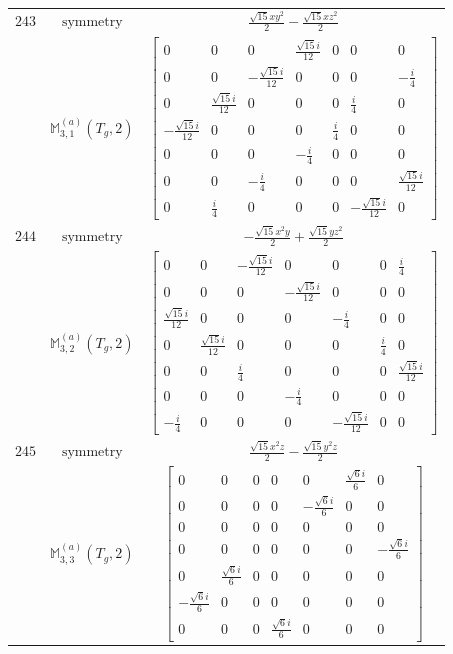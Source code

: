 \documentclass[fleqn,8pt,landscape]{jsarticle}
\begin{document}
\begin{longtable}{ccc}
$ 243 $ & $ \text{symmetry} $ & $ \frac{\sqrt{15} x y^{2}}{2} - \frac{\sqrt{15} x z^{2}}{2} $ \\
$  $ & $ \mathbb{M}_{3,1}^{(a)}(T_{g},2) $ & $ \begin{bmatrix} 0 & 0 & 0 & \frac{\sqrt{15} i}{12} & 0 & 0 & 0 \\ 0 & 0 & - \frac{\sqrt{15} i}{12} & 0 & 0 & 0 & - \frac{i}{4} \\ 0 & \frac{\sqrt{15} i}{12} & 0 & 0 & 0 & \frac{i}{4} & 0 \\ - \frac{\sqrt{15} i}{12} & 0 & 0 & 0 & \frac{i}{4} & 0 & 0 \\ 0 & 0 & 0 & - \frac{i}{4} & 0 & 0 & 0 \\ 0 & 0 & - \frac{i}{4} & 0 & 0 & 0 & \frac{\sqrt{15} i}{12} \\ 0 & \frac{i}{4} & 0 & 0 & 0 & - \frac{\sqrt{15} i}{12} & 0 \end{bmatrix} $ \\ \hline
$ 244 $ & $ \text{symmetry} $ & $ - \frac{\sqrt{15} x^{2} y}{2} + \frac{\sqrt{15} y z^{2}}{2} $ \\
$  $ & $ \mathbb{M}_{3,2}^{(a)}(T_{g},2) $ & $ \begin{bmatrix} 0 & 0 & - \frac{\sqrt{15} i}{12} & 0 & 0 & 0 & \frac{i}{4} \\ 0 & 0 & 0 & - \frac{\sqrt{15} i}{12} & 0 & 0 & 0 \\ \frac{\sqrt{15} i}{12} & 0 & 0 & 0 & - \frac{i}{4} & 0 & 0 \\ 0 & \frac{\sqrt{15} i}{12} & 0 & 0 & 0 & \frac{i}{4} & 0 \\ 0 & 0 & \frac{i}{4} & 0 & 0 & 0 & \frac{\sqrt{15} i}{12} \\ 0 & 0 & 0 & - \frac{i}{4} & 0 & 0 & 0 \\ - \frac{i}{4} & 0 & 0 & 0 & - \frac{\sqrt{15} i}{12} & 0 & 0 \end{bmatrix} $ \\ \hline
$ 245 $ & $ \text{symmetry} $ & $ \frac{\sqrt{15} x^{2} z}{2} - \frac{\sqrt{15} y^{2} z}{2} $ \\
$  $ & $ \mathbb{M}_{3,3}^{(a)}(T_{g},2) $ & $ \begin{bmatrix} 0 & 0 & 0 & 0 & 0 & \frac{\sqrt{6} i}{6} & 0 \\ 0 & 0 & 0 & 0 & - \frac{\sqrt{6} i}{6} & 0 & 0 \\ 0 & 0 & 0 & 0 & 0 & 0 & 0 \\ 0 & 0 & 0 & 0 & 0 & 0 & - \frac{\sqrt{6} i}{6} \\ 0 & \frac{\sqrt{6} i}{6} & 0 & 0 & 0 & 0 & 0 \\ - \frac{\sqrt{6} i}{6} & 0 & 0 & 0 & 0 & 0 & 0 \\ 0 & 0 & 0 & \frac{\sqrt{6} i}{6} & 0 & 0 & 0 \end{bmatrix} $ \\ \hline

\end{longtable}
\end{document}
